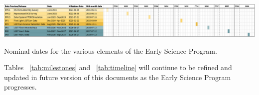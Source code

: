 \begin{table}[ht]
\centering
\includegraphics[width=\linewidth]{figures/DPR-timeline}
\caption{Nominal dates for the various elements of the Early Science Program.}
\label{tab:timeline}
\end{table}

Tables ~\ref{tab:milestones} and ~\ref{tab:timeline} will continue to be refined and updated in future version of this documents as the Early Science Program progresses.
